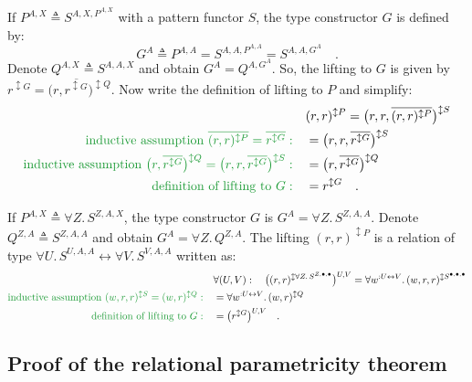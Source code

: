 If $P^{A,X}\triangleq S^{A,X,P^{A,X}}$ with a pattern functor $S$,
the type constructor $G$ is defined by: 
\[
G^{A}\triangleq P^{A,A}=S^{A,A,P^{A,A}}=S^{A,A,G^{A}}\quad.
\]
Denote $Q^{A,X}\triangleq S^{A,A,X}$ and obtain $G^{A}=Q^{A,G^{A}}$.
So, the lifting to $G$ is given by $r^{\updownarrow G}=\big(r,\overline{r^{\updownarrow G}}\big)^{\updownarrow Q}$.
Now write the definition of lifting to $P$ and simplify:
\begin{align*}
 & (r,r)^{\updownarrow P}=\big(r,r,\overline{(r,r)^{\updownarrow P}}\big)^{\updownarrow S}\\
{\color{greenunder}\text{inductive assumption }\overline{(r,r)^{\updownarrow P}}=\overline{r^{\updownarrow G}}:}\quad & =\big(r,r,\overline{r^{\updownarrow G}}\big)^{\updownarrow S}\\
{\color{greenunder}\text{inductive assumption }\big(r,\overline{r^{\updownarrow G}}\big)^{\updownarrow Q}=\big(r,r,\overline{r^{\updownarrow G}}\big)^{\updownarrow S}:}\quad & =\big(r,\overline{r^{\updownarrow G}}\big)^{\updownarrow Q}\\
{\color{greenunder}\text{definition of lifting to }G:}\quad & =r^{\updownarrow G}\quad.
\end{align*}

If $P^{A,X}\triangleq\forall Z.\,S^{Z,A,X}$, the type constructor
$G$ is $G^{A}=\forall Z.\,S^{Z,A,A}$. Denote $Q^{Z,A}\triangleq S^{Z,A,A}$
and obtain $G^{A}=\forall Z.\,Q^{Z,A}$. The lifting $(r,r)^{\updownarrow P}$
is a relation of type $\forall U.\,S^{U,A,A}\leftrightarrow\forall V.\,S^{V,A,A}$
written as:
\begin{align*}
 & \forall(U,V):\quad\big((r,r)^{\updownarrow\forall Z.\,S^{Z,\bullet,\bullet}}\big)^{U,V}=\forall w^{:U\leftrightarrow V}.\,(w,r,r)^{\updownarrow S^{\bullet,\bullet,\bullet}}\\
{\color{greenunder}\text{inductive assumption }(w,r,r)^{\updownarrow S}=(w,r)^{\updownarrow Q}:}\quad & =\forall w^{:U\leftrightarrow V}.\,(w,r)^{\updownarrow Q}\\
{\color{greenunder}\text{definition of lifting to }G:}\quad & =\big(r^{\updownarrow G}\big)^{U,V}\quad.
\end{align*}


\subsection{Proof of the relational parametricity theorem\label{subsec:Relational-parametricity-theorem}}

